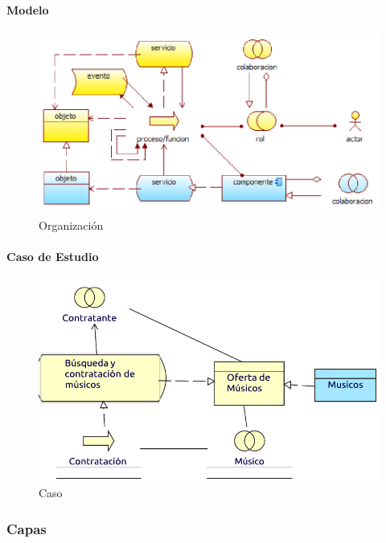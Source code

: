 \paragraph{Modelo}
\begin{figure}[h!]
	\centering
	\includegraphics[width=\linewidth]{Desarrollo/ArquitecturaEmpresarial/Tecnologia/imgs/realizacionMetamodelo.PNG}
	\caption{Organización}
\end{figure}
\newpage
\paragraph{Caso de Estudio}

\begin{figure}[h!]
	\centering
	\includegraphics[width=\linewidth]{Desarrollo/ArquitecturaEmpresarial/Tecnologia/imgs/realizacion.pdf}
	\caption{Caso}
\end{figure}

\newpage

\subsubsection{Capas}
